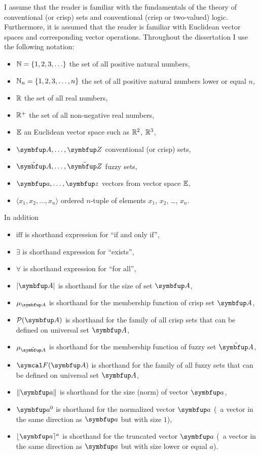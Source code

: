 I assume that the reader is familiar with the fundamentals of the theory of conventional (or crisp) sets and conventional (crisp or two-valued) logic. Furthermore, it is assumed that the reader is familiar with Euclidean vector spaces and corresponding vector operations. Throughout the dissertation I use the following notation:

\begin{itemize}
	\item $\mathbb{N}=\left\{1,2,3,\ldots\right\}$ the set of all positive natural numbers,
	\item $\mathbb{N}_n=\left\{1,2,3,\ldots,n\right\}$ the set of all positive natural numbers lower or equal $n$,
	\item $\mathbb{R}$ the set of all real numbers,
	\item $\mathbb{R}^+$ the set of all non-negative real numbers,
	\item $\mathbb{E}$ an Euclidean vector space such as $\mathbb{R}^2$, $\mathbb{R}^3$,
	\item $\set{A},\ldots,\set{Z}$ conventional (or crisp) sets,
	\item $\fset{A},\ldots,\fset{Z}$ fuzzy sets,
	\item $\vect{a},\ldots,\vect{z}$ vectors from vector space $\mathbb{E}$,
	\item $\langle x_1,x_2,\ldots,x_n \rangle$ ordered $n$-tuple of elements $x_1$, $x_2$, \ldots, $x_n$.
\end{itemize}

\noindent In addition
\begin{itemize}
	\item $\mathrm{iff}$ is shorthand expression for ``if and only if'',
	\item $\exists$ is shorthand expression for ``exists'',
	\item $\forall$ is shorthand expression for ``for all'',
	\item $\left|\set{A}\right|$ is shorthand for the size of set $\set{A}$,
	\item $\mu_\set{A}$ is shorthand for the membership function of crisp set $\set{A}$,
	\item $\powset{\set{A}}$ is shorthand for the family of all crisp sets that can be defined on universal set $\set{A}$, 
	\item $\mu_\fset{A}$ is shorthand for the membership function of fuzzy set $\fset{A}$,
	\item $\fpowset{\set{A}}$ is shorthand for the family of all fuzzy sets that can be defined on universal set $\set{A}$, 
	\item $\left\|\vect{a}\right\|$ is shorthand for the size (norm) of vector $\vect{a}$,
	\item $\vect{a}^0$ is shorthand for the normalized vector $\vect{a}$ (\ie\ a vector in the same direction as $\vect{a}$ but with size $1$),
	\item $\lfloor\vect{a}\rceil^a$ is shorthand for the truncated vector $\vect{a}$ (\ie\ a vector in the same direction as $\vect{a}$ but with size lower or equal $a$).
\end{itemize}
